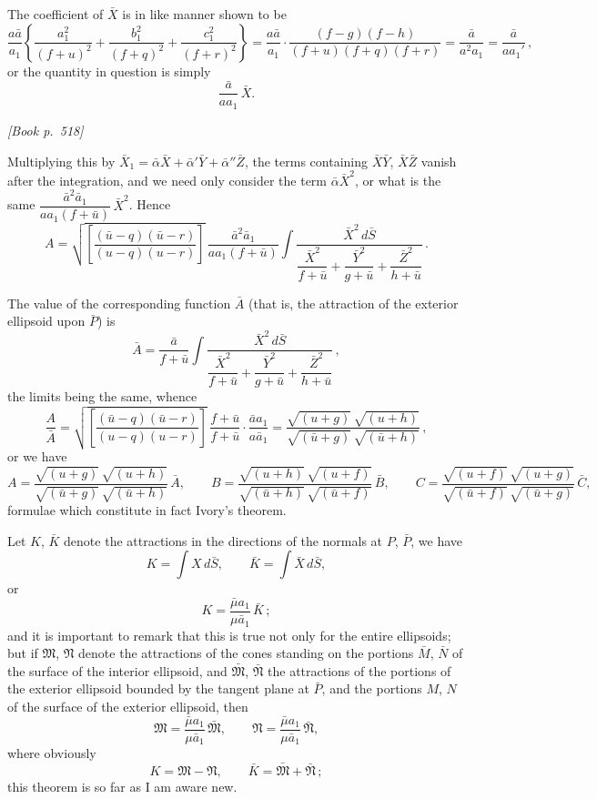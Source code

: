 \documentclass[11pt]{article}
\begin{document}
The coefficient of $\bar{X}$ is in like manner shown to be
\[
\frac{a\bar{a}}{a_{1}}\!\left\{\frac{a_{1}^{2}}{(f + u)^{2}} + \frac{b_{1}^{2}}{(f + q)^{2}} + \frac{c_{1}^{2}}{(f + r)^{2}}\right\} = \frac{a\bar{a}}{a_{1}}\cdot\frac{(f - g)(f - h)}{(f + u)(f + q)(f + r)} = \frac{\bar{a}}{a^{2} a_{1}} = \frac{\bar{a}}{a a_{1}'}\,,
\]
or the quantity in question is simply
\[
\frac{\bar{a}}{a a_{1}}\,\bar{X}.
\]

\medskip
\noindent\textit{[Book p.~518]}\hfill

\smallskip

\noindent Multiplying this by $\bar{X}_{1} = \bar{\alpha}\bar{X} + \bar{\alpha}'\bar{Y} + \bar{\alpha}''\bar{Z}$, the terms containing $\bar{X}\bar{Y}$, $\bar{X}\bar{Z}$ vanish after the integration, and we need only consider the term $\bar{\alpha}\bar{X}^{2}$, or what is the same $\dfrac{\bar{a}^{2} \bar{a}_{1}}{a a_{1}(f + \bar{u})}\,\bar{X}^{2}$. Hence
\[
A = \sqrt{\!\left[\frac{(\bar{u} - q)(\bar{u} - r)}{(u - q)(u - r)}\right]}\,\frac{\bar{a}^{2} \bar{a}_{1}}{a a_{1}(f + \bar{u})}\!\int \frac{\bar{X}^{2}\, d\bar{S}}{\dfrac{\bar{X}^{2}}{f + \bar{u}} + \dfrac{\bar{Y}^{2}}{g + \bar{u}} + \dfrac{\bar{Z}^{2}}{h + \bar{u}}}\,.
\]

The value of the corresponding function $\bar{A}$ (that is, the attraction of the exterior ellipsoid upon $\bar{P}$) is
\[
\bar{A} = \frac{\bar{a}}{f + \bar{u}}\!\int \frac{\bar{X}^{2}\, d\bar{S}}{\dfrac{\bar{X}^{2}}{f + \bar{u}} + \dfrac{\bar{Y}^{2}}{g + \bar{u}} + \dfrac{\bar{Z}^{2}}{h + \bar{u}}}\,,
\]
the limits being the same, whence
\[
\frac{A}{\bar{A}} = \sqrt{\!\left[\frac{(\bar{u} - q)(\bar{u} - r)}{(u - q)(u - r)}\right]}\,\frac{f + \bar{u}}{f + \bar{u}}\cdot\frac{\bar{a} a_{1}}{a \bar{a}_{1}} = \frac{\sqrt{(u + g)}\,\sqrt{(u + h)}}{\sqrt{(\bar{u} + g)}\,\sqrt{(\bar{u} + h)}}\,,
\]
or we have
\[
A = \frac{\sqrt{(u + g)}\,\sqrt{(u + h)}}{\sqrt{(\bar{u} + g)}\,\sqrt{(\bar{u} + h)}}\,\bar{A},\qquad B = \frac{\sqrt{(u + h)}\,\sqrt{(u + f)}}{\sqrt{(\bar{u} + h)}\,\sqrt{(\bar{u} + f)}}\,\bar{B},\qquad C = \frac{\sqrt{(u + f)}\,\sqrt{(u + g)}}{\sqrt{(\bar{u} + f)}\,\sqrt{(\bar{u} + g)}}\,\bar{C},
\]
formulae which constitute in fact Ivory's theorem.

Let $K$, $\bar{K}$ denote the attractions in the directions of the normals at $P$, $\bar{P}$, we have
\[
K = \int X\, d\bar{S},\qquad \bar{K} = \int \bar{X}\, d\bar{S},
\]
or
\[
K = \frac{\bar{\mu} a_{1}}{\mu \bar{a}_{1}}\,\bar{K}\,;
\]
and it is important to remark that this is true not only for the entire ellipsoids; but if $\mathfrak{M}$, $\mathfrak{N}$ denote the attractions of the cones standing on the portions $\bar{M}$, $\bar{N}$ of the surface of the interior ellipsoid, and $\bar{\mathfrak{M}}$, $\bar{\mathfrak{N}}$ the attractions of the portions of the exterior ellipsoid bounded by the tangent plane at $\bar{P}$, and the portions $M$, $N$ of the surface of the exterior ellipsoid, then
\[
\mathfrak{M} = \frac{\bar{\mu} a_{1}}{\mu \bar{a}_{1}}\,\bar{\mathfrak{M}},\qquad \mathfrak{N} = \frac{\bar{\mu} a_{1}}{\mu \bar{a}_{1}}\,\bar{\mathfrak{N}},
\]
where obviously
\[
K = \mathfrak{M} - \mathfrak{N},\qquad \bar{K} = \bar{\mathfrak{M}} + \bar{\mathfrak{N}}\,;
\]
this theorem is so far as I am aware new.
\end{document}
